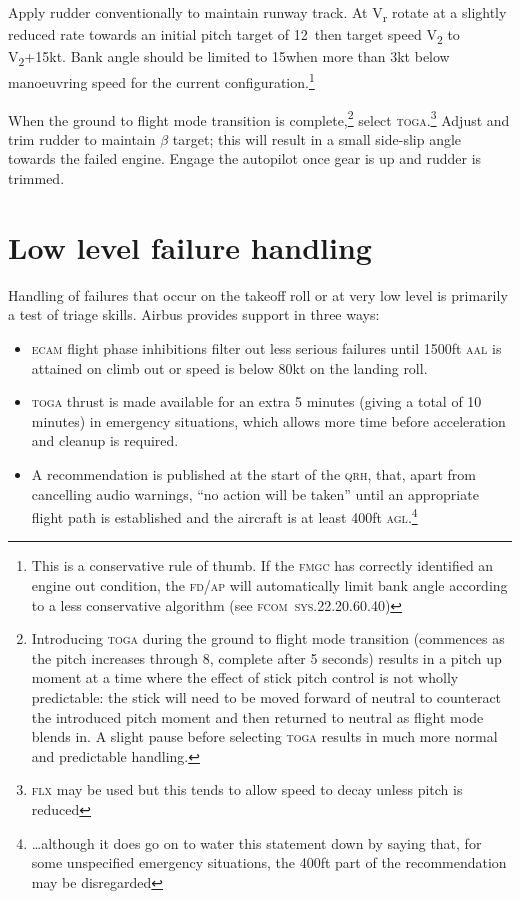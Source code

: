 \documentclass[a5paper,11pt,twoside]{book}
\newcommand{\ac}[1]{{\scshape\MakeLowercase{#1}}}
\newcommand{\inlcite}[1]{{\ac{#1}}}
\newcommand{\V}[1]{V\textsubscript{#1}}
\begin{document}
Apply rudder conventionally to maintain runway track. At V\textsubscript{r}
rotate at a slightly reduced rate towards an initial pitch target of
12\textonehalf\textdegree\, then target speed \V{2} to \V{2}+15kt. Bank angle
should be limited to 15\textdegree{ }when more than 3kt below manoeuvring speed
for the current configuration.\footnote{This is a conservative rule of thumb. If
the \ac{FMGC} has correctly identified an engine out condition, the \ac{FD/AP}
will automatically limit bank angle according to a less conservative algorithm
(see \inlcite{FCOM~SYS.22.20.60.40})}

When the ground to flight mode transition is complete,\footnote{Introducing
\ac{TOGA} during the ground to flight mode transition (commences as the pitch
increases through 8\textdegree, complete after 5 seconds) results in a pitch up
moment at a time where the effect of stick pitch control is not wholly
predictable: the stick will need to be moved forward of neutral to counteract
the introduced pitch moment and then returned to neutral as flight mode blends
in. A slight pause before selecting \ac{TOGA} results in much more normal and
predictable handling.} select \ac{TOGA}.\footnote{\ac{FLX} may be used but this
tends to allow speed to decay unless pitch is reduced} Adjust and trim rudder
to maintain $\beta$ target; this will result in a small side-slip angle towards
the failed engine. Engage the autopilot once gear is up and rudder is trimmed.


\section{Low level failure handling}
\label{sec-failures-after-v1}

Handling of failures that occur on the takeoff roll or at very low level is
primarily a test of triage skills. Airbus provides support in three ways:

\begin{itemize}
\item \ac{ECAM} flight phase inhibitions filter out less serious failures until
  1500ft \ac{AAL} is attained on climb out or speed is below 80kt on the landing
  roll.
\item \ac{TOGA} thrust is made available for an extra 5 minutes (giving a total
  of 10 minutes) in emergency situations, which allows more time before
  acceleration and cleanup is required.
\item A recommendation is published at the start of the \ac{QRH}, that, apart
  from cancelling audio warnings, ``no action will be taken'' until an
  appropriate flight path is established and the aircraft is at least 400ft
  \ac{AGL}.\footnote{\ldots although it does go on to water this statement down
  by saying that, for some unspecified emergency situations, the 400ft part of
  the recommendation may be disregarded}
\end{itemize}
\end{document}
